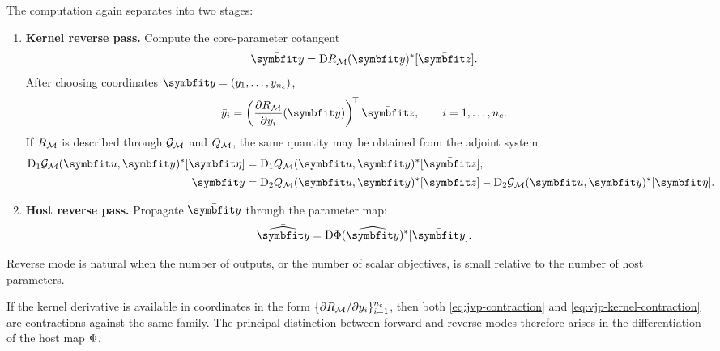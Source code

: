 The computation again separates into two stages:
\begin{enumerate}
    \item \textbf{Kernel reverse pass.} Compute the core-parameter cotangent
    \[
    \bar{\CoreParameters}
    =
    \D \ResponseMap_{\ModelFamily}(\CoreParameters)^*[\bar{\bm z}].
    \]
    After choosing coordinates \(\CoreParameters=(y_1,\ldots,y_{n_{\mathrm c}})\),
    \begin{equation}
    \label{eq:vjp-kernel-contraction}
    \bar y_i
    =
    \left(
        \frac{\partial \ResponseMap_{\ModelFamily}}{\partial y_i}(\CoreParameters)
    \right)^{\!\top}
    \bar{\bm z},
    \qquad
    i=1,\ldots,n_{\mathrm c}.
    \end{equation}
    If \(R_{\mathcal M}\) is described through
    \(\mathcal G_{\mathcal M}\) and \(Q_{\mathcal M}\), the same quantity may be obtained from the adjoint system
    \begin{align}
    \label{eq:adjoint-equation}
    \D_1 \Residual_{\ModelFamily}(\State,\CoreParameters)^*[\AdjointState]
    &=
    \D_1 \Observation_{\ModelFamily}(\State,\CoreParameters)^*[\bar{\bm z}],
    \\
    \label{eq:adjoint-gradient}
    \bar{\CoreParameters}
    &=
    \D_2 \Observation_{\ModelFamily}(\State,\CoreParameters)^*[\bar{\bm z}]
    -
    \D_2 \Residual_{\ModelFamily}(\State,\CoreParameters)^*[\AdjointState].
    \end{align}

    \item \textbf{Host reverse pass.} Propagate \(\bar{\CoreParameters}\) through the parameter map:
    \[
    \bar{\HostParameters}
    =
    \D \ParameterMap(\HostParameters)^*[\bar{\CoreParameters}].
    \]
\end{enumerate}
Reverse mode is natural when the number of outputs, or the number of scalar objectives, is small relative to the number of host parameters.

\begin{remark}
If the kernel derivative is available in coordinates in the form 
\(\{\partial R_{\mathcal M}/\partial y_i\}_{i=1}^{n_{\mathrm c}}\),
then both \eqref{eq:jvp-contraction} and \eqref{eq:vjp-kernel-contraction}
are contractions against the same family. The principal distinction between forward and reverse modes therefore arises in the differentiation of the host map \(\Phi\).
\end{remark}


